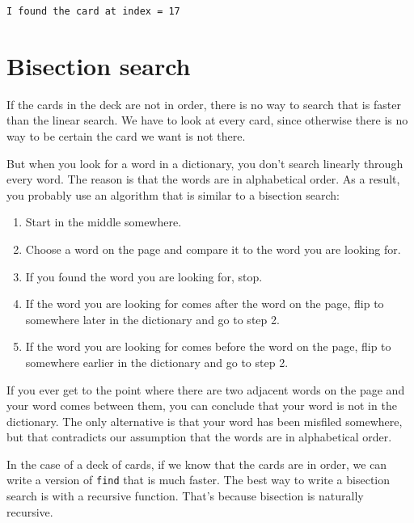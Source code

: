 \begin{verbatim}
I found the card at index = 17
\end{verbatim}
%


\section{Bisection search}

If the cards in the deck are not in order, there is no way to search
that is faster than the linear search.  We have to look at every card,
since otherwise there is no way to be certain the card we want is not
there.

But when you look for a word in a dictionary, you don't search
linearly through every word.  The reason is that the words are in
alphabetical order.  As a result, you probably use an algorithm that
is similar to a bisection search:

\begin {enumerate}

\item Start in the middle somewhere.

\item Choose a word on the page and compare it to the word you
are looking for.

\item If you found the word you are looking for, stop.

\item If the word you are looking for comes after the word on
the page, flip to somewhere later in the dictionary and go to
step 2.

\item If the word you are looking for comes before the word on
the page, flip to somewhere earlier in the dictionary and go to
step 2.

\end {enumerate}

If you ever get to the point where there are two adjacent words on the
page and your word comes between them, you can conclude that your word
is not in the dictionary.  The only alternative is that your word has
been misfiled somewhere, but that contradicts our assumption that the
words are in alphabetical order.

In the case of a deck of cards, if we know that the cards are in
order, we can write a version of {\tt find} that is much faster.  The
best way to write a bisection search is with a recursive function.
That's because bisection is naturally recursive.

